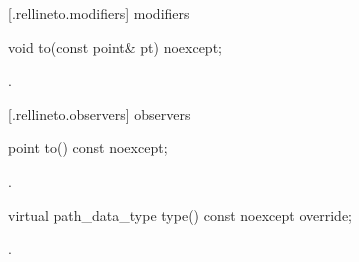  [\iotwod.rellineto.modifiers]{ modifiers}

\begin{itemdecl}
    void to(const point& pt) noexcept;
\end{itemdecl}
\begin{itemdescr}
	\pnum
	\postconditions
	.
	
\end{itemdescr}

 [\iotwod.rellineto.observers]{ observers}

\begin{itemdecl}
    point to() const noexcept;
\end{itemdecl}
\begin{itemdescr}
	\pnum
	\returns
	.

\end{itemdescr}

\begin{itemdecl}
    virtual path_data_type type() const noexcept override;
\end{itemdecl}
\begin{itemdescr}
	\pnum
	\returns
	.

\end{itemdescr}
